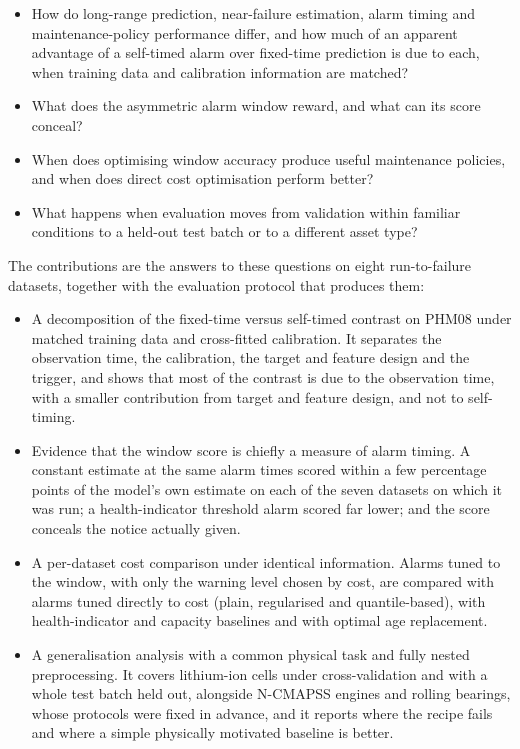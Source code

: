 \documentclass[a4paper,fleqn,doubleblind]{cas-dc}
\begin{document}
\begin{itemize}[leftmargin=1.2em,itemsep=2pt]
\item[(Q1)] How do long-range prediction, near-failure estimation, alarm timing and maintenance-policy performance differ, and how much of an apparent advantage of a self-timed alarm over fixed-time prediction is due to each, when training data and calibration information are matched?
\item[(Q2)] What does the asymmetric alarm window reward, and what can its score conceal?
\item[(Q3)] When does optimising window accuracy produce useful maintenance policies, and when does direct cost optimisation perform better?
\item[(Q4)] What happens when evaluation moves from validation within familiar conditions to a held-out test batch or to a different asset type?
\end{itemize}

The contributions are the answers to these questions on eight run-to-failure datasets, together with the evaluation protocol that produces them:

\begin{itemize}[leftmargin=1.2em,itemsep=2pt]
\item[(i)] A decomposition of the fixed-time versus self-timed contrast on PHM08 under matched training data and cross-fitted calibration. It separates the observation time, the calibration, the target and feature design and the trigger, and shows that most of the contrast is due to the observation time, with a smaller contribution from target and feature design, and not to self-timing.
\item[(ii)] Evidence that the window score is chiefly a measure of alarm timing. A constant estimate at the same alarm times scored within a few percentage points of the model's own estimate on each of the seven datasets on which it was run; a health-indicator threshold alarm scored far lower; and the score conceals the notice actually given.
\item[(iii)] A per-dataset cost comparison under identical information. Alarms tuned to the window, with only the warning level chosen by cost, are compared with alarms tuned directly to cost (plain, regularised and quantile-based), with health-indicator and capacity baselines and with optimal age replacement.
\item[(iv)] A generalisation analysis with a common physical task and fully nested preprocessing. It covers lithium-ion cells under cross-validation and with a whole test batch held out, alongside N-CMAPSS engines and rolling bearings, whose protocols were fixed in advance, and it reports where the recipe fails and where a simple physically motivated baseline is better.
\end{itemize}
\end{document}
